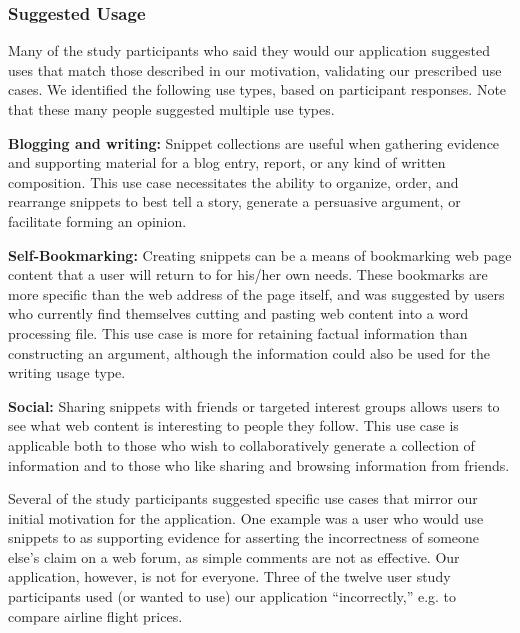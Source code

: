 \documentclass{chi2009}
\begin{document}

\subsubsection{Suggested Usage}
Many of the study participants who said they would our application suggested uses that match those described in our motivation, validating our prescribed use cases.  We identified the following use types, based on participant responses. Note that these many people suggested multiple use types.

\textbf{Blogging and writing:} Snippet collections are useful when gathering evidence and supporting material for a blog entry, report, or any kind of written composition. This use case necessitates the ability to organize, order, and rearrange snippets to best tell a story, generate a persuasive argument, or facilitate forming an opinion.

\textbf{Self-Bookmarking:} Creating snippets can be a means of bookmarking web page content that a user will return to for his/her own needs. These bookmarks are more specific than the web address of the page itself, and was suggested by users who currently find themselves cutting and pasting web content into a word processing file. This use case is more for retaining factual information than constructing an argument, although the information could also be used for the writing usage type.

\textbf{Social:} Sharing snippets with friends or targeted interest groups allows users to see what web content is interesting to people they follow. This use case is applicable both to those who wish to collaboratively generate a collection of information and to those who like sharing and browsing information from friends.

Several of the study participants suggested specific use cases that mirror our initial motivation for the application. One example was a user who would use snippets to as supporting evidence for asserting the incorrectness of someone else's claim on a web forum, as simple comments are not as effective. Our application, however, is not for everyone. Three of the twelve user study participants used (or wanted to use) our application ``incorrectly,'' e.g. to compare airline flight prices.
\end{document}
